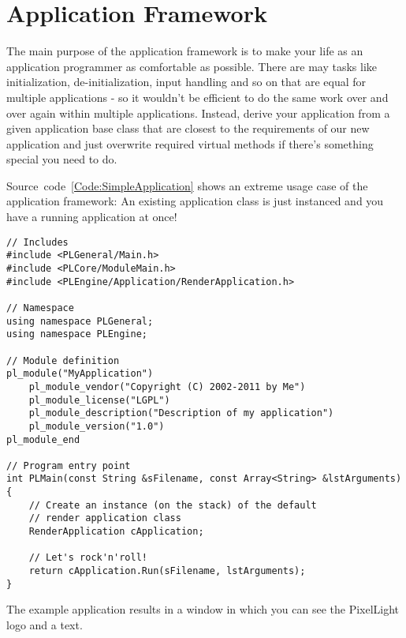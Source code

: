 \chapter{Application Framework}
The main purpose of the application framework is to make your life as an application programmer as comfortable as possible. There are may tasks like initialization, de-initialization, input handling and so on that are equal for multiple applications - so it wouldn't be efficient to do the same work over and over again within multiple applications. Instead, derive your application from a given application base class that are closest to the requirements of our new application and just overwrite required virtual methods if there's something special you need to do.

Source~code~\ref{Code:SimpleApplication} shows an extreme usage case of the application framework: An existing application class is just instanced and you have a running application at once!
\begin{lstlisting}[label=Code:SimpleApplication,caption={Simple application using the application framework}]
// Includes
#include <PLGeneral/Main.h>
#include <PLCore/ModuleMain.h>
#include <PLEngine/Application/RenderApplication.h>

// Namespace
using namespace PLGeneral;
using namespace PLEngine;

// Module definition
pl_module("MyApplication")
	pl_module_vendor("Copyright (C) 2002-2011 by Me")
	pl_module_license("LGPL")
	pl_module_description("Description of my application")
	pl_module_version("1.0")
pl_module_end

// Program entry point
int PLMain(const String &sFilename, const Array<String> &lstArguments)
{
	// Create an instance (on the stack) of the default
	// render application class
	RenderApplication cApplication;

	// Let's rock'n'roll!
	return cApplication.Run(sFilename, lstArguments);
}
\end{lstlisting}
The example application results in a window in which you can see the PixelLight logo and a text.
